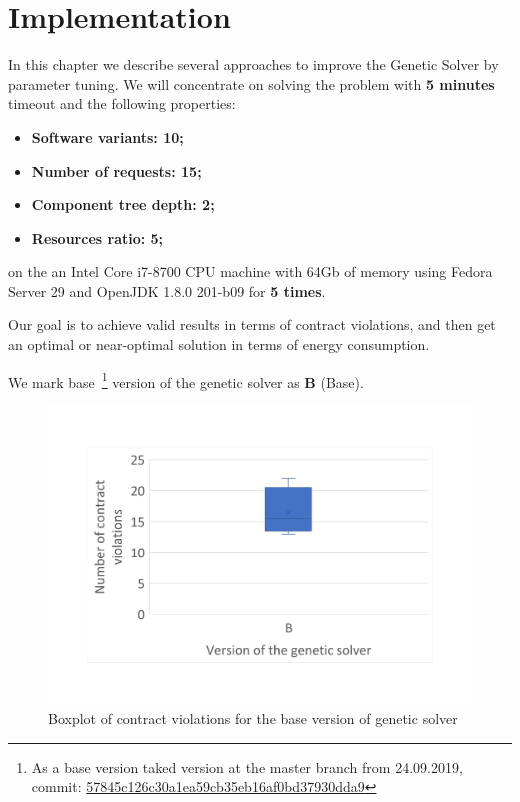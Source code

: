 \chapter{Implementation}\label{chapter:Implementation}

In this chapter we describe several approaches to improve the Genetic Solver by parameter tuning.
We will concentrate on solving the problem with \textbf{5 minutes} timeout and the following properties:
\begin{itemize}
	\item \textbf{Software variants: 10;}
	\item \textbf{Number of requests: 15;}
	\item \textbf{Component tree depth: 2;}
	\item \textbf{Resources ratio: 5;}
\end{itemize}
on the an Intel Core i7-8700 CPU machine with 64Gb of memory using Fedora Server 29 and OpenJDK 1.8.0 201-b09 for \textbf{5 times}.

Our goal is to achieve valid results in terms of contract violations, and then get an optimal or near-optimal solution in terms of energy consumption. 

We mark base~\footnote{As a base version taked version at the master branch from 24.09.2019, commit: \href{https://git-st.inf.tu-dresden.de/mquat/mquat2/commit/57845c126c30a1ea59cb35eb16af0bd37930dda9}{57845c126c30a1ea59cb35eb16af0bd37930dda9}} version of the genetic solver as \textbf{B} (Base).


\begin{figure}
	\centering
	\includegraphics[width=\textwidth]{images/BoxPlotSolverBasic}
	\caption[Boxplot of contract violations for the base version of genetic solver]{Boxplot of contract violations for the base version of genetic solver}
	\label{fig:boxplotsolverbasic}
\end{figure}



